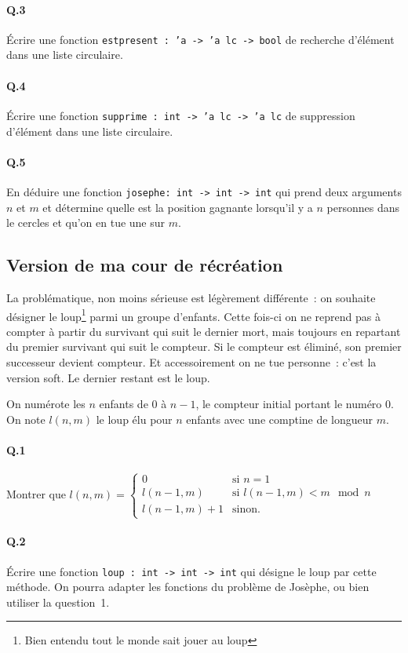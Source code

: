 \documentclass[10pt,a4paper]{article}
\begin{document}
\paragraph{Q.3} Écrire une fonction \texttt{estpresent : 'a -> 'a lc -> bool} de recherche d'élément dans une liste circulaire.

\paragraph{Q.4} Écrire une fonction \texttt{supprime : int -> 'a lc -> 'a lc} de suppression d'élément dans une liste circulaire.

\paragraph{Q.5} En déduire une fonction \texttt{josephe: int -> int -> int} qui prend deux arguments $n$ et $m$ et détermine quelle est la position gagnante
lorsqu'il y a $n$ personnes dans le cercles et qu'on en tue une sur $m$.

\subsection{Version de ma cour de récréation}
La problématique, non moins sérieuse est légèrement différente~: on souhaite désigner le loup\footnote{Bien entendu tout le monde sait jouer au loup} parmi un groupe d'enfants.
Cette fois-ci on ne reprend pas à compter à partir du survivant qui suit le dernier mort, mais toujours en repartant du premier survivant qui suit le compteur. Si le compteur est éliminé, son premier successeur devient compteur.
Et accessoirement on ne tue personne~: c'est la version soft. Le dernier restant est le loup.

On numérote les $n$ enfants de $0$ à $n-1$, le compteur initial portant le numéro $0$. On note $l(n,m)$ le loup élu pour $n$ enfants avec une comptine de longueur $m$.

\paragraph{Q.1} Montrer que $l(n,m) = \left\{
	\begin{array}{ll}
		0  & \mbox{si } n = 1 \\
		l(n-1,m) & \mbox{si } l(n-1,m) < m \mod n \\
		l(n-1,m) + 1 & \mbox{sinon}.
	\end{array}
\right. $
\paragraph{Q.2} Écrire une fonction \texttt{loup : int -> int -> int} qui désigne le loup par cette méthode. On pourra adapter les fonctions du problème de Josèphe, ou bien utiliser la question 1.
\end{document}
